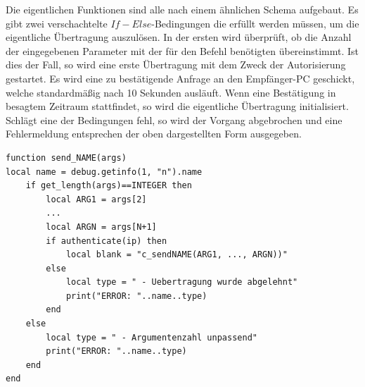 Die eigentlichen Funktionen sind alle nach einem ähnlichen Schema aufgebaut. Es gibt zwei verschachtelte $If-Else$-Bedingungen die erfüllt werden müssen, um die eigentliche Übertragung auszulösen. In der ersten wird überprüft, ob die Anzahl der eingegebenen Parameter mit der für den Befehl benötigten übereinstimmt. Ist dies der Fall, so wird eine erste Übertragung mit dem Zweck der Autorisierung gestartet. Es wird eine zu bestätigende Anfrage an den Empfänger-PC geschickt, welche standardmäßig nach 10 Sekunden ausläuft. Wenn eine Bestätigung in besagtem Zeitraum stattfindet, so wird die eigentliche Übertragung initialisiert. Schlägt eine der Bedingungen fehl, so wird der Vorgang abgebrochen und eine Fehlermeldung entsprechen der oben dargestellten Form ausgegeben.
\begin{lstlisting}[caption = {Beispielhafte Sende Funktion}]
function send_NAME(args)
local name = debug.getinfo(1, "n").name
    if get_length(args)==INTEGER then
        local ARG1 = args[2]
        ...
        local ARGN = args[N+1]
        if authenticate(ip) then
            local blank = "c_sendNAME(ARG1, ..., ARGN))"
        else
        	local type = " - Uebertragung wurde abgelehnt"
            print("ERROR: "..name..type)
        end
    else
    	local type = " - Argumentenzahl unpassend"
        print("ERROR: "..name..type)
    end
end
\end{lstlisting}

%

